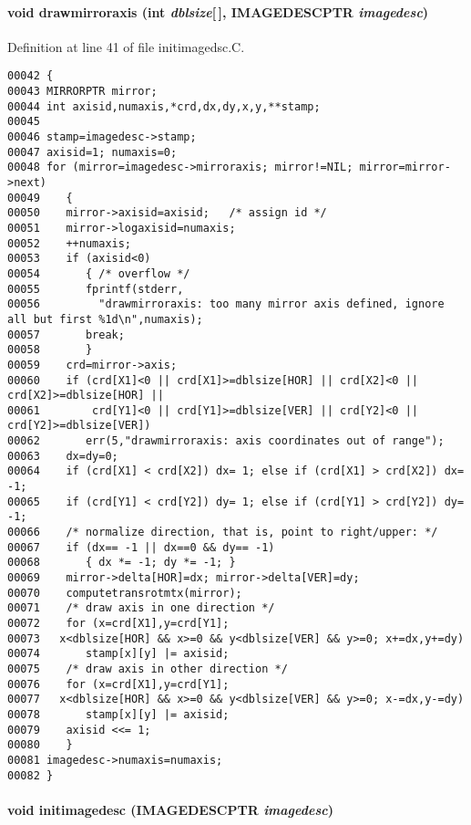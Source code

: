 \paragraph{\setlength{\rightskip}{0pt plus 5cm}void drawmirroraxis (int {\em dblsize}[$\,$], {\bf IMAGEDESCPTR} {\em imagedesc})}\hfill



Definition at line 41 of file initimagedsc.C.\small\begin{verbatim}00042 {
00043 MIRRORPTR mirror;
00044 int axisid,numaxis,*crd,dx,dy,x,y,**stamp;
00045 
00046 stamp=imagedesc->stamp;
00047 axisid=1; numaxis=0;
00048 for (mirror=imagedesc->mirroraxis; mirror!=NIL; mirror=mirror->next)
00049    {
00050    mirror->axisid=axisid;   /* assign id */
00051    mirror->logaxisid=numaxis;
00052    ++numaxis;
00053    if (axisid<0)
00054       { /* overflow */
00055       fprintf(stderr,
00056         "drawmirroraxis: too many mirror axis defined, ignore all but first %1d\n",numaxis);
00057       break;
00058       }
00059    crd=mirror->axis;
00060    if (crd[X1]<0 || crd[X1]>=dblsize[HOR] || crd[X2]<0 || crd[X2]>=dblsize[HOR] ||
00061        crd[Y1]<0 || crd[Y1]>=dblsize[VER] || crd[Y2]<0 || crd[Y2]>=dblsize[VER])
00062       err(5,"drawmirroraxis: axis coordinates out of range");
00063    dx=dy=0;
00064    if (crd[X1] < crd[X2]) dx= 1; else if (crd[X1] > crd[X2]) dx= -1;
00065    if (crd[Y1] < crd[Y2]) dy= 1; else if (crd[Y1] > crd[Y2]) dy= -1;
00066    /* normalize direction, that is, point to right/upper: */
00067    if (dx== -1 || dx==0 && dy== -1)
00068       { dx *= -1; dy *= -1; }
00069    mirror->delta[HOR]=dx; mirror->delta[VER]=dy;
00070    computetransrotmtx(mirror);
00071    /* draw axis in one direction */
00072    for (x=crd[X1],y=crd[Y1];
00073   x<dblsize[HOR] && x>=0 && y<dblsize[VER] && y>=0; x+=dx,y+=dy)
00074       stamp[x][y] |= axisid;
00075    /* draw axis in other direction */
00076    for (x=crd[X1],y=crd[Y1];
00077   x<dblsize[HOR] && x>=0 && y<dblsize[VER] && y>=0; x-=dx,y-=dy)
00078       stamp[x][y] |= axisid;
00079    axisid <<= 1;
00080    }
00081 imagedesc->numaxis=numaxis;
00082 }
\end{verbatim}\normalsize 
\label{im.h_a9}
\paragraph{\setlength{\rightskip}{0pt plus 5cm}void initimagedesc ({\bf IMAGEDESCPTR} {\em imagedesc})}\hfill



